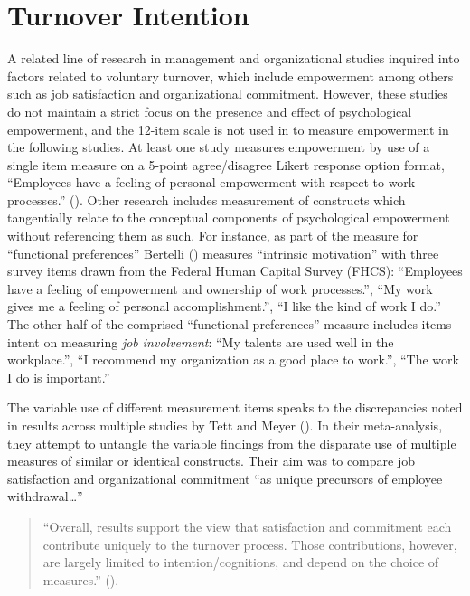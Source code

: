 \documentclass[
  11pt,
  a4paper,
]{article}
\begin{document}
\section{Turnover Intention}\label{turnover-intention}

A related line of research in management and organizational studies
inquired into factors related to voluntary turnover, which include
empowerment among others such as job satisfaction and organizational
commitment. However, these studies do not maintain a strict focus on the
presence and effect of psychological empowerment, and the 12-item scale
is not used in to measure empowerment in the following studies. At least
one study measures empowerment by use of a single item measure on a
5-point agree/disagree Likert response option format, ``Employees have a
feeling of personal empowerment with respect to work processes.''
(). Other
research includes measurement of constructs which tangentially relate to
the conceptual components of psychological empowerment without
referencing them as such. For instance, as part of the measure for
``functional preferences'' Bertelli ()
measures ``intrinsic motivation'' with three survey items drawn from the
Federal Human Capital Survey (FHCS): ``Employees have a feeling of
empowerment and ownership of work processes.'', ``My work gives me a
feeling of personal accomplishment.'', ``I like the kind of work I do.''
The other half of the comprised ``functional preferences'' measure
includes items intent on measuring \emph{job involvement}: ``My talents
are used well in the workplace.'', ``I recommend my organization as a
good place to work.'', ``The work I do is important.''

The variable use of different measurement items speaks to the
discrepancies noted in results across multiple studies by Tett and Meyer
(). In their meta-analysis, they attempt to
untangle the variable findings from the disparate use of multiple
measures of similar or identical constructs. Their aim was to compare
job satisfaction and organizational commitment ``as unique precursors of
employee withdrawal\ldots{}''

\begin{quote}
``Overall, results support the view that satisfaction and commitment
each contribute uniquely to the turnover process. Those contributions,
however, are largely limited to intention/cognitions, and depend on the
choice of measures.'' ().
\end{quote}
\end{document}
